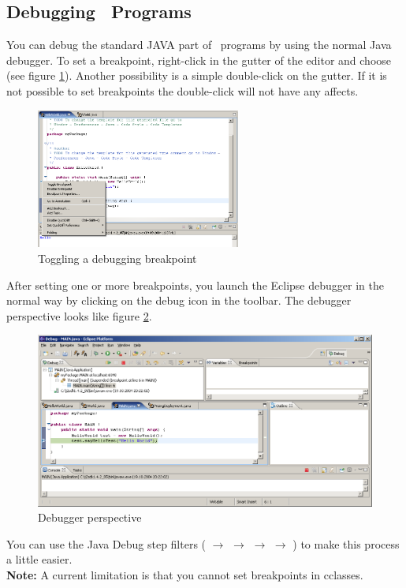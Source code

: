 \subsection{Debugging \caesarj ~Programs}
You can debug the standard JAVA part of \caesarj ~programs by using the normal Java debugger. To set a breakpoint, right-click in the gutter of the editor and choose (see figure \ref{fig:brake_point}). Another possibility is a simple double-click on the gutter. If it is not possible to set breakpoints the double-click will not have any affects.
\begin{figure}[htbp]
	\centering
		\includegraphics[width=0.60\textwidth]{images/brake_point.png}
	\caption{Toggling a debugging breakpoint}
	\label{fig:brake_point}
\end{figure}

After setting one or more breakpoints, you launch the Eclipse debugger in the normal way by clicking on the debug icon in the toolbar. The debugger perspective looks like figure \ref{fig:debuger}.
\begin{figure}[htbp]
	\centering
		\includegraphics[width=1.0\textwidth]{images/debug1.png}
	\caption{Debugger perspective}
	\label{fig:debuger}
\end{figure}

You can use the Java Debug step filters ( $\rightarrow$  $\rightarrow$  $\rightarrow$  $\rightarrow$ ) to make this process a little easier.\\
\textbf{Note:} A current limitation is that you cannot set breakpoints in cclasses.
